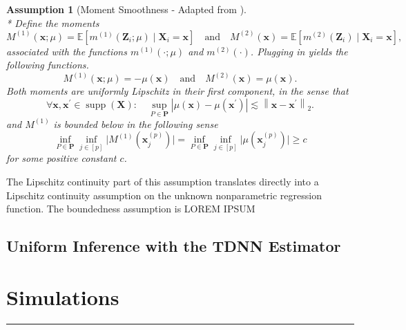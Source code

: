 \documentclass[letterpaper,10pt]{article}
\numberwithin{equation}{section}
\numberwithin{thm}{section}
\numberwithin{lem}{section}
\numberwithin{cor}{section}
\newtheorem{asm}{Assumption}
\newcommand{\E}{\mathbb{E}}
\newcommand{\1}{\mathbbm{1}}
\begin{document}
\begin{asm}[Moment Smoothness - Adapted from \citet{ritzwoller_uniform_2024}]\mbox{}\\*
	Define the moments
	\begin{equation}
		M^{(1)}(\mathbf{x} ; \mu)
		= \E\left[m^{(1)}\left(\mathbf{Z}_i ; \mu\right) \mid \mathbf{X}_i= \mathbf{x}\right]
		\quad \text{and} \quad
		M^{(2)}(\mathbf{x})
		= \E\left[m^{(2)}\left(\mathbf{Z}_i\right) \mid \mathbf{X}_i = \mathbf{x}\right],
	\end{equation}
	associated with the functions $m^{(1)}(\cdot ; \mu)$ and $m^{(2)}(\cdot)$.
	Plugging in yields the following functions.
	\begin{equation}
		M^{(1)}(\mathbf{x} ; \mu)
		= -\mu(\mathbf{x})
		\quad \text{and} \quad
		M^{(2)}(\mathbf{x})
		= \mu(\mathbf{x}).
	\end{equation}
	Both moments are uniformly Lipschitz in their first component, in the sense that
	\begin{equation}
		\forall \mathbf{x}, \mathbf{x}^{\prime} \in \operatorname{supp}\left(\mathbf{X}\right): \quad
		\sup _{P \in \mathbf{P}}
		\left|\mu(\mathbf{x})-\mu\left(\mathbf{x}^{\prime}\right)\right|
		\lesssim\left\|\mathbf{x}-\mathbf{x}^{\prime}\right\|_{2}.
	\end{equation}
	and $M^{(1)}$ is bounded below in the following sense
	\begin{equation}
		\inf_{P \in \mathbf{P}} \inf_{j \in [p]} \Big|M^{(1)}\left(\mathbf{x}^{(p)}_{j}\right) \Big|
		= \inf_{P \in \mathbf{P}} \inf_{j \in [p]} \Big|\mu\left(\mathbf{x}^{(p)}_{j}\right) \Big| \geq c
	\end{equation}
	for some positive constant $c$.
\end{asm}

The Lipschitz continuity part of this assumption translates directly into a Lipschitz continuity assumption on the unknown nonparametric regression function.
The boundedness assumption is
	{\color{red} LOREM IPSUM}

\subsection{Uniform Inference with the TDNN Estimator}

\newpage
\section{Simulations}\label{Simulations}
\hrule
\end{document}
